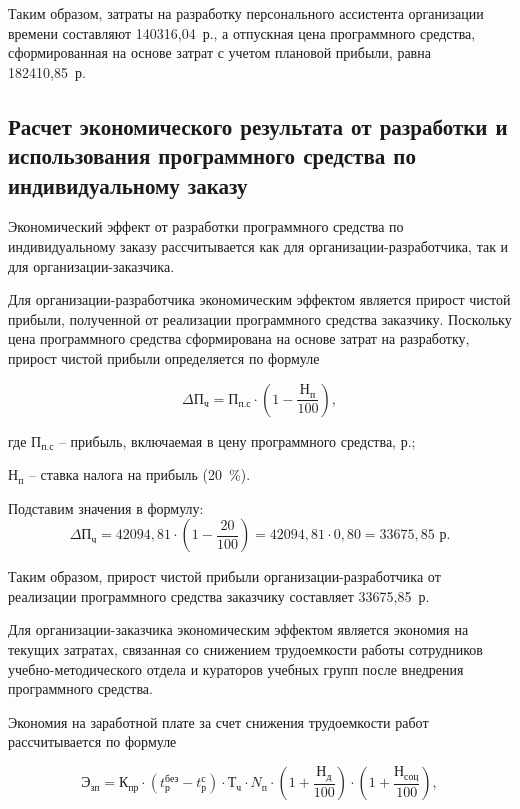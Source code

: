 Таким образом, затраты на разработку персонального ассистента организации времени составляют 140316{,}04~р., а отпускная цена программного средства, сформированная на основе затрат с учетом плановой прибыли, равна 182410{,}85~р.

\subsection{Расчет экономического результата от разработки и использования программного средства по индивидуальному заказу}

Экономический эффект от разработки программного средства по индивидуальному заказу рассчитывается как для организации-разработчика, так и для организации-заказчика.

\numberedparagraph
Для организации-разработчика экономическим эффектом является прирост чистой прибыли, полученной от реализации программного средства заказчику. Поскольку цена программного средства сформирована на основе затрат на разработку, прирост чистой прибыли определяется по формуле

\begin{equation}
    \Delta\text{П}_{\text{ч}} = \text{П}_{\text{п.с}} \cdot \left(1 - \frac{\text{Н}_{\text{п}}}{100}\right),
\end{equation}

где $\text{П}_{\text{п.с}}$ -- прибыль, включаемая в цену программного средства, р.;

    $\text{Н}_{\text{п}}$ -- ставка налога на прибыль (20~\%).

Подставим значения в формулу:
$$
    \Delta\text{П}_{\text{ч}} = 42094{,}81 \cdot \left(1 - \frac{20}{100}\right) = 42094{,}81 \cdot 0{,}80 = 33675{,}85 \text{ р}.
$$

Таким образом, прирост чистой прибыли организации-разработчика от реализации программного средства заказчику составляет 33675{,}85~р.

\numberedparagraph
Для организации-заказчика экономическим эффектом является экономия на текущих затратах, связанная со снижением трудоемкости работы сотрудников учебно-методического отдела и кураторов учебных групп после внедрения программного средства.

Экономия на заработной плате за счет снижения трудоемкости работ рассчитывается по формуле

\begin{equation}
    \text{Э}_{\text{зп}} = \text{К}_{\text{пр}} \cdot (t_{\text{р}}^{\text{без}} - t_{\text{р}}^{\text{с}}) \cdot \text{Т}_{\text{ч}} \cdot N_{\text{п}} \cdot \left(1 + \frac{\text{Н}_{\text{д}}}{100}\right) \cdot \left(1 + \frac{\text{Н}_{\text{соц}}}{100}\right),
\end{equation}

